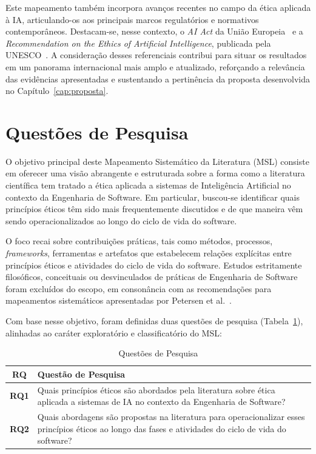 Este mapeamento também incorpora avanços recentes no campo da ética aplicada à IA, articulando-os aos principais marcos regulatórios e normativos contemporâneos. Destacam-se, nesse contexto, o \textit{AI Act} da União Europeia~\cite{EUAIAct2024} e a \textit{Recommendation on the Ethics of Artificial Intelligence}, publicada pela UNESCO~\cite{UNESCO2021}. A consideração desses referenciais contribui para situar os resultados em um panorama internacional mais amplo e atualizado, reforçando a relevância das evidências apresentadas e sustentando a pertinência da proposta desenvolvida no Capítulo~\ref{cap:proposta}.

\section{Questões de Pesquisa}

O objetivo principal deste Mapeamento Sistemático da Literatura (MSL) consiste em oferecer uma visão abrangente e estruturada sobre a forma como a literatura científica tem tratado a ética aplicada a sistemas de Inteligência Artificial no contexto da Engenharia de Software. Em particular, buscou-se identificar quais princípios éticos têm sido mais frequentemente discutidos e de que maneira vêm sendo operacionalizados ao longo do ciclo de vida do software.

O foco recai sobre contribuições práticas, tais como métodos, processos, \textit{frameworks}, ferramentas e artefatos que estabelecem relações explícitas entre princípios éticos e atividades do ciclo de vida do software. Estudos estritamente filosóficos, conceituais ou desvinculados de práticas de Engenharia de Software foram excluídos do escopo, em consonância com as recomendações para mapeamentos sistemáticos apresentadas por Petersen et al.~\cite{Petersen2015}.

Com base nesse objetivo, foram definidas duas questões de pesquisa (Tabela~\ref{tab:research-questions}), alinhadas ao caráter exploratório e classificatório do MSL:

\begin{table}[htb!]
  \centering
  \caption{Questões de Pesquisa}
  \label{tab:research-questions}
  \footnotesize
  \begin{tabular}{|c|p{14.2cm}|}
    \hline
    \textbf{RQ} & \textbf{Questão de Pesquisa} \\
    \hline
    \textbf{RQ1} & Quais princípios éticos são abordados pela literatura sobre ética aplicada a sistemas de IA no contexto da Engenharia de Software? \\
    \hline
    \textbf{RQ2} & Quais abordagens são propostas na literatura para operacionalizar esses princípios éticos ao longo das fases e atividades do ciclo de vida do software? \\
    \hline
  \end{tabular}
\end{table}

